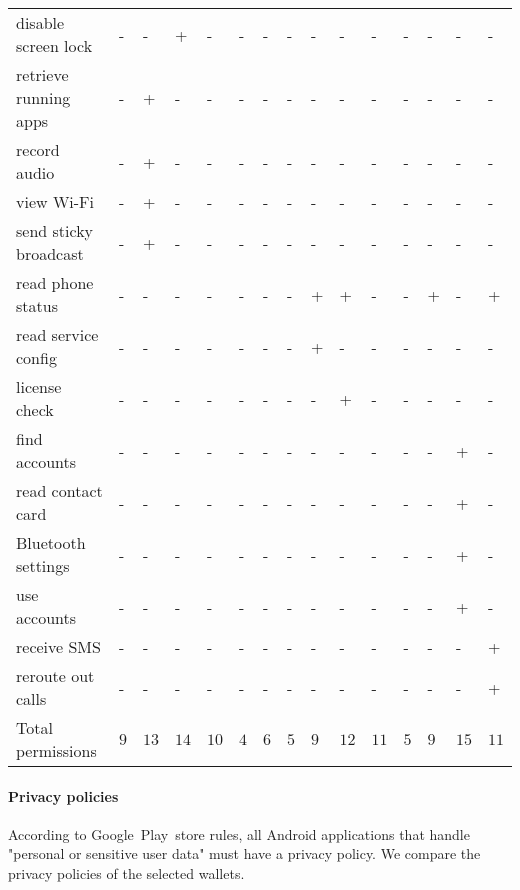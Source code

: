 \begin{table*}
\begin{tabular}{|l|lllllll|lllllll|}
		disable screen lock & - & - & + & - & - & - & - & - & - & - & - & - & - & - \\
		retrieve running apps & - & + & - & - & - & - & - & - & - & - & - & - & - & - \\
		record audio & - & + & - & - & - & - & - & - & - & - & - & - & - & - \\
		view Wi-Fi & - & + & - & - & - & - & - & - & - & - & - & - & - & - \\
		send sticky broadcast & - & + & - & - & - & - & - & - & - & - & - & - & - & - \\
		read phone status & - & - & - & - & - & - & - & + & + & - & - & + & - & + \\
		read service config & - & - & - & - & - & - & - & + & - & - & - & - & - & - \\
		license check & - & - & - & - & - & - & - & - & + & - & - & - & - & - \\
		find accounts & - & - & - & - & - & - & - & - & - & - & - & - & + & - \\
		read contact card & - & - & - & - & - & - & - & - & - & - & - & - & + & - \\
		Bluetooth settings & - & - & - & - & - & - & - & - & - & - & - & - & + & - \\
		use accounts & - & - & - & - & - & - & - & - & - & - & - & - & + & - \\
		receive SMS & - & - & - & - & - & - & - & - & - & - & - & - & - & + \\
		reroute out calls & - & - & - & - & - & - & - & - & - & - & - & - & - & + \\
		\hline
		Total permissions & $9$ & $13$ & $14$ & $10$ & $4$ & $6$ & $5$ & $9$ & $12$ & $11$ & $5$ & $9$ & $15$ & $11$ \\
		\hline
	\end{tabular}
	\label{tab:permissions}
\end{table*}


\paragraph{Privacy policies}
According to Google~Play~store rules, all Android applications that handle "personal or sensitive user data" must have a privacy policy.
We compare the privacy policies of the selected wallets.

